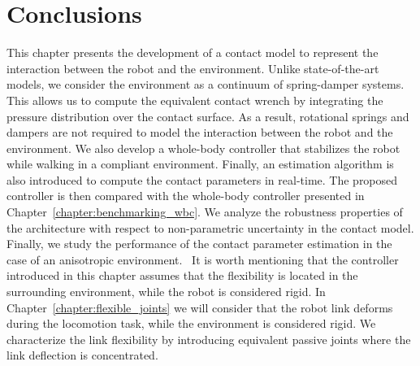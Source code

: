 \section{Conclusions \label{sec:conclusions_compliant}}
This chapter presents the development of a contact model to represent the interaction between the robot and the environment. Unlike state-of-the-art models, we consider the environment as a continuum of spring-damper systems. This allows us to compute the equivalent contact wrench by integrating the pressure distribution over the contact surface. As a result, rotational springs and dampers are not required to model the interaction between the robot and the environment. We also develop a whole-body controller that stabilizes the robot while walking in a compliant environment. Finally, an estimation algorithm is also introduced to compute the contact parameters in real-time. The proposed controller is then compared with the whole-body controller presented in Chapter~\ref{chapter:benchmarking_wbc}. We analyze the robustness properties of the architecture with respect to non-parametric uncertainty in the contact model. Finally, we study the performance of the contact parameter estimation in the case of an anisotropic environment. 
It is worth mentioning that the controller introduced in this chapter assumes that the flexibility is located in the surrounding environment, while the robot is considered rigid. In Chapter~\ref{chapter:flexible_joints} we will consider that the robot link deforms during the locomotion task, while the environment is considered rigid. We characterize the link flexibility by introducing equivalent passive joints where the link deflection is concentrated.